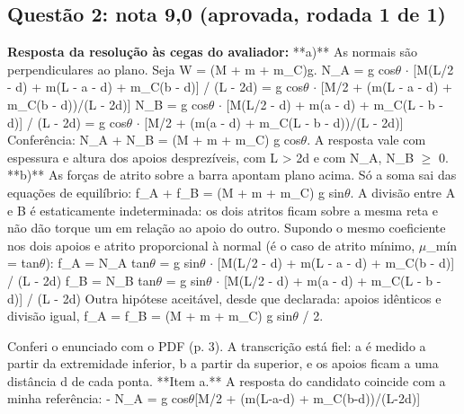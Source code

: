\documentclass{article}%
\begin{document}
\subsection*{Questão 2: nota 9,0 (aprovada, rodada 1 de 1)}%
\textbf{Resposta da resolução às cegas do avaliador:} **a)** As normais são perpendiculares ao plano. Seja W = (M + m + m\_C)g.\newline%
N\_A = g cos$\theta$ $\cdot$ {[}M(L/2 - d) + m(L - a - d) + m\_C(b - d){]} / (L - 2d) = g cos$\theta$ $\cdot$ {[}M/2 + (m(L - a - d) + m\_C(b - d))/(L - 2d){]}\newline%
N\_B = g cos$\theta$ $\cdot$ {[}M(L/2 - d) + m(a - d) + m\_C(L - b - d){]} / (L - 2d) = g cos$\theta$ $\cdot$ {[}M/2 + (m(a - d) + m\_C(L - b - d))/(L - 2d){]}\newline%
Conferência: N\_A + N\_B = (M + m + m\_C) g cos$\theta$. A resposta vale com espessura e altura dos apoios desprezíveis, com L > 2d e com N\_A, N\_B $\geq$ 0.\newline%
\newline%
**b)** As forças de atrito sobre a barra apontam plano acima. Só a soma sai das equações de equilíbrio:\newline%
f\_A + f\_B = (M + m + m\_C) g sin$\theta$.\newline%
A divisão entre A e B é estaticamente indeterminada: os dois atritos ficam sobre a mesma reta e não dão torque um em relação ao apoio do outro.\newline%
Supondo o mesmo coeficiente nos dois apoios e atrito proporcional à normal (é o caso de atrito mínimo, $\mu$\_mín = tan$\theta$):\newline%
f\_A = N\_A tan$\theta$ = g sin$\theta$ $\cdot$ {[}M(L/2 - d) + m(L - a - d) + m\_C(b - d){]} / (L - 2d)\newline%
f\_B = N\_B tan$\theta$ = g sin$\theta$ $\cdot$ {[}M(L/2 - d) + m(a - d) + m\_C(L - b - d){]} / (L - 2d)\newline%
Outra hipótese aceitável, desde que declarada: apoios idênticos e divisão igual, f\_A = f\_B = (M + m + m\_C) g sin$\theta$ / 2.\par %
Conferi o enunciado com o PDF (p. 3). A transcrição está fiel: a é medido a partir da extremidade inferior, b a partir da superior, e os apoios ficam a uma distância d de cada ponta.\newline%
\newline%
**Item a.** A resposta do candidato coincide com a minha referência:\newline%
{-} N\_A = g cos$\theta${[}M/2 + (m(L-a-d) + m\_C(b-d))/(L-2d){]}\newline%
\end{document}

